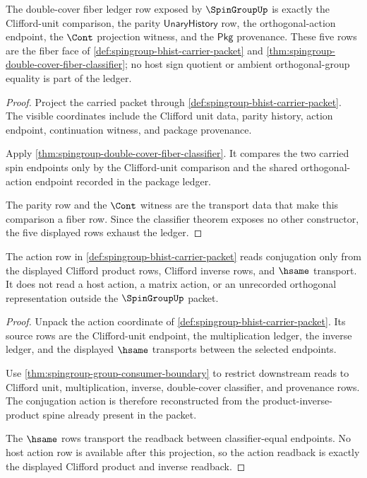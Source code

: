 \begin{theorem}
\label{thm:spingroup-double-cover-fiber-ledger}
The double-cover fiber ledger row exposed by $\SpinGroupUp$ is exactly the
Clifford-unit comparison, the parity $\mathsf{UnaryHistory}$ row, the
orthogonal-action endpoint, the $\Cont$ projection witness, and the
$\mathsf{Pkg}$ provenance. These five rows are the fiber face of
\autoref{def:spingroup-bhist-carrier-packet} and
\autoref{thm:spingroup-double-cover-fiber-classifier}; no host sign quotient
or ambient orthogonal-group equality is part of the ledger.
\end{theorem}
\begin{proof}
Project the carried packet through
\autoref{def:spingroup-bhist-carrier-packet}. The visible coordinates include
the Clifford unit data, parity history, action endpoint, continuation witness,
and package provenance.

Apply \autoref{thm:spingroup-double-cover-fiber-classifier}. It compares the
two carried spin endpoints only by the Clifford-unit comparison and the shared
orthogonal-action endpoint recorded in the package ledger.

The parity row and the $\Cont$ witness are the transport data that make this
comparison a fiber row. Since the classifier theorem exposes no other
constructor, the five displayed rows exhaust the ledger.
\end{proof}

\begin{theorem}
\label{thm:spingroup-conjugation-action-readback}
The action row in \autoref{def:spingroup-bhist-carrier-packet} reads
conjugation only from the displayed Clifford product rows, Clifford inverse
rows, and $\hsame$ transport. It does not read a host action, a matrix action,
or an unrecorded orthogonal representation outside the $\SpinGroupUp$ packet.
\end{theorem}
\begin{proof}
Unpack the action coordinate of
\autoref{def:spingroup-bhist-carrier-packet}. Its source rows are the
Clifford-unit endpoint, the multiplication ledger, the inverse ledger, and the
displayed $\hsame$ transports between the selected endpoints.

Use \autoref{thm:spingroup-group-consumer-boundary} to restrict downstream
reads to Clifford unit, multiplication, inverse, double-cover classifier, and
provenance rows. The conjugation action is therefore reconstructed from the
product-inverse-product spine already present in the packet.

The $\hsame$ rows transport the readback between classifier-equal endpoints.
No host action row is available after this projection, so the action readback
is exactly the displayed Clifford product and inverse readback.
\end{proof}

